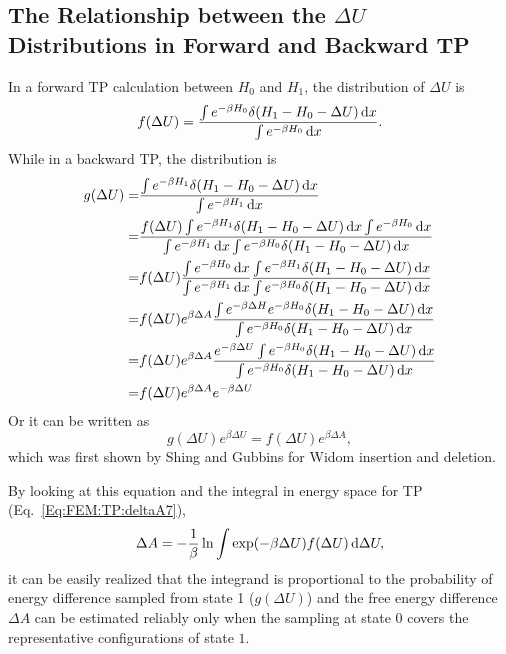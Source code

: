 \begin{appendices}
\chapter{The Relationship between the $\Delta U$ Distributions in Forward and Backward TP\label{chapter:Appendix:DeltaUDistributions}}
In a forward TP calculation between $H_0$ and $H_1$, the distribution of $\Delta U$ is
\begin{equation}
    f(\Delta U)=\frac{\int e^{-\beta H_0}\delta(H_1-H_0-\Delta U)\mathop{}\!\mathrm{d} x}{\int e^{-\beta H_0}\mathop{}\!\mathrm{d} x}.
\end{equation}
While in a backward TP, the distribution is
\begin{align}
    g(\Delta U)=&\frac{\int e^{-\beta H_1}\delta(H_1-H_0-\Delta U)\diff x}{\int e^{-\beta H_1}\diff x}\notag\\
               =&\frac{f(\Delta U)\int e^{-\beta H_1}\delta(H_1-H_0-\Delta U)\diff x\int e^{-\beta H_0}\diff x}{\int e^{-\beta H_1}\diff x\int e^{-\beta H_0}\delta(H_1-H_0-\Delta U)\diff x}\notag\\
               =&f(\Delta U)\frac{\int e^{-\beta H_0}\diff x }{\int e^{-\beta H_1}\diff x}\frac{\int e^{-\beta H_1}\delta(H_1-H_0-\Delta U)\diff x}{\int e^{-\beta H_0}\delta(H_1-H_0-\Delta U)\diff x}\notag\\
               =&f(\Delta U)e^{\beta\Delta A}\frac{\int e^{-\beta\Delta H}e^{-\beta H_0}\delta(H_1-H_0-\Delta U)\diff x}{\int e^{-\beta H_0}\delta(H_1-H_0-\Delta U)\diff x}\notag\\
               =&f(\Delta U)e^{\beta\Delta A}\frac{e^{-\beta\Delta U}\int e^{-\beta H_0}\delta(H_1-H_0-\Delta U)\diff x}{\int e^{-\beta H_0}\delta(H_1-H_0-\Delta U)\diff x}\notag\\
               =&f(\Delta U)e^{\beta\Delta A}e^{-\beta\Delta U}
\end{align}
Or it can be written as
\begin{equation}
    g(\Delta U)e^{\beta\Delta U}=f(\Delta U)e^{\beta\Delta A},
\end{equation}
which was first shown by Shing and Gubbins for Widom insertion and deletion\cite{ShingMolPhys1982}.

By looking at this equation and the integral in energy space for TP (Eq.~\ref{Eq:FEM:TP:deltaA7}), 
\begin{equation}
	\Delta A = -\frac{1}{\beta} \ln \int \exp(-\beta \Delta U) f(\Delta U) \mathop{}\!\mathrm{d}\Delta U,
\end{equation}
it can be easily realized that the integrand is proportional to the probability of energy difference sampled from state 1 ($g(\Delta U)$) and the free energy difference $\Delta A$ can be estimated reliably only when the sampling at state $0$ covers the representative configurations of state $1$.


\end{appendices}
